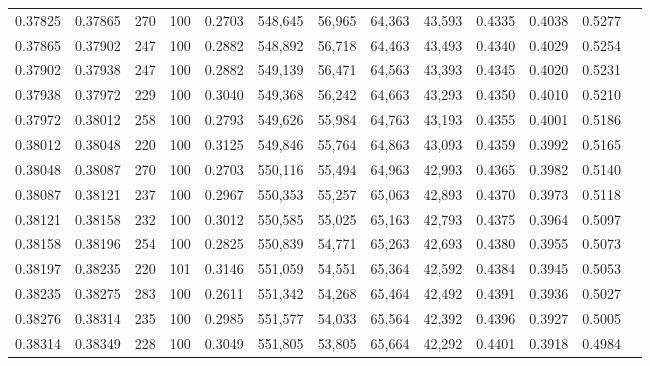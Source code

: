 \begin{tabular}{rrrrrrrrrrrrr}
0.37825 & 0.37865 &   270 & 100 &                                     0.2703 & 548,645 &  56,965 &  64,363 &  43,593 & 0.4335 & 0.4038 & 0.5277 \\
0.37865 & 0.37902 &   247 & 100 &                                     0.2882 & 548,892 &  56,718 &  64,463 &  43,493 & 0.4340 & 0.4029 & 0.5254 \\
0.37902 & 0.37938 &   247 & 100 &                                     0.2882 & 549,139 &  56,471 &  64,563 &  43,393 & 0.4345 & 0.4020 & 0.5231 \\
0.37938 & 0.37972 &   229 & 100 &                                     0.3040 & 549,368 &  56,242 &  64,663 &  43,293 & 0.4350 & 0.4010 & 0.5210 \\
0.37972 & 0.38012 &   258 & 100 &                                     0.2793 & 549,626 &  55,984 &  64,763 &  43,193 & 0.4355 & 0.4001 & 0.5186 \\
0.38012 & 0.38048 &   220 & 100 &                                     0.3125 & 549,846 &  55,764 &  64,863 &  43,093 & 0.4359 & 0.3992 & 0.5165 \\
0.38048 & 0.38087 &   270 & 100 &                                     0.2703 & 550,116 &  55,494 &  64,963 &  42,993 & 0.4365 & 0.3982 & 0.5140 \\
0.38087 & 0.38121 &   237 & 100 &                                     0.2967 & 550,353 &  55,257 &  65,063 &  42,893 & 0.4370 & 0.3973 & 0.5118 \\
0.38121 & 0.38158 &   232 & 100 &                                     0.3012 & 550,585 &  55,025 &  65,163 &  42,793 & 0.4375 & 0.3964 & 0.5097 \\
0.38158 & 0.38196 &   254 & 100 &                                     0.2825 & 550,839 &  54,771 &  65,263 &  42,693 & 0.4380 & 0.3955 & 0.5073 \\
0.38197 & 0.38235 &   220 & 101 &                                     0.3146 & 551,059 &  54,551 &  65,364 &  42,592 & 0.4384 & 0.3945 & 0.5053 \\
0.38235 & 0.38275 &   283 & 100 &                                     0.2611 & 551,342 &  54,268 &  65,464 &  42,492 & 0.4391 & 0.3936 & 0.5027 \\
0.38276 & 0.38314 &   235 & 100 &                                     0.2985 & 551,577 &  54,033 &  65,564 &  42,392 & 0.4396 & 0.3927 & 0.5005 \\
0.38314 & 0.38349 &   228 & 100 &                                     0.3049 & 551,805 &  53,805 &  65,664 &  42,292 & 0.4401 & 0.3918 & 0.4984 \\

\end{tabular}
